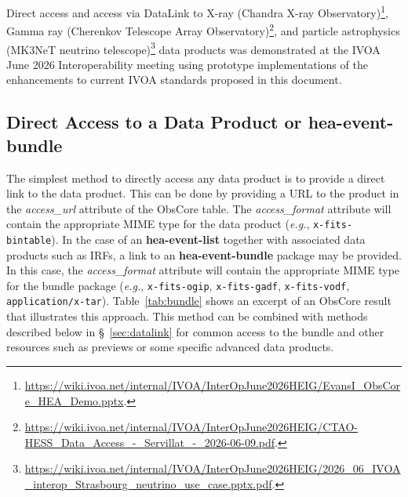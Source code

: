 Direct access and access via DataLink to X-ray (Chandra X-ray Observatory)\footnote{\url{https://wiki.ivoa.net/internal/IVOA/InterOpJune2026HEIG/EvansI_ObsCore_HEA_Demo.pptx}.}, Gamma ray (Cherenkov Telescope Array Observatory)\footnote{\url{https://wiki.ivoa.net/internal/IVOA/InterOpJune2026HEIG/CTAO-HESS_Data_Access_-_Servillat_-_2026-06-09.pdf}.}, and particle astrophysics (MK3NeT neutrino telescope)\footnote{\url{https://wiki.ivoa.net/internal/IVOA/InterOpJune2026HEIG/2026_06_IVOA_interop_Strasbourg_neutrino_use_case.pptx.pdf}.} data products was demonstrated at the IVOA June 2026 Interoperability meeting using prototype implementations of the enhancements to current IVOA standards proposed in this document.

\subsection{Direct Access to a Data Product or {\bf hea-event-bundle}}

The simplest method to directly access any data product is to provide a direct link to the data product.  This can be done by providing a URL to the product in the {\em access\_url\/} attribute of the ObsCore table. The {\em access\_format\/} attribute will contain the appropriate MIME type for the data product ({\em e.g.\/}, {\tt x-fits-bintable}).  In the case of an {\bf hea-event-list} together with associated data products such as \glspl{IRF}, a link to an {\bf hea-event-bundle} package may be provided.  In this case, the {\em access\_format \/} attribute will contain the appropriate MIME type for the bundle package ({\em e.g.\/}, {\tt x-fits-ogip}, {\tt x-fits-gadf\/}, {\tt x-fits-vodf}, {\tt application/x-tar}). Table~\ref{tab:bundle} shows an excerpt of an ObsCore result that illustrates this approach. This method  can be combined with methods described below in \S~\ref{sec:datalink} for common access to the bundle and other resources such as previews or some specific advanced data products.

